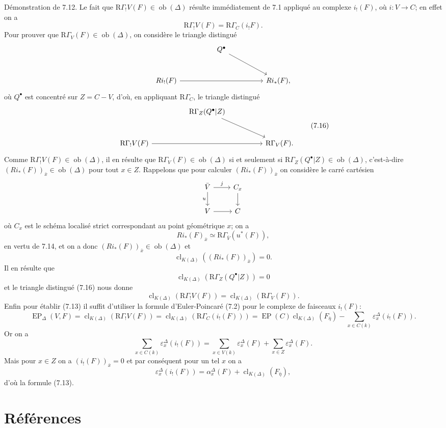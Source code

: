 \documentclass[11pt]{article}
\providecommand{\EP}{\operatorname{EP}}
\providecommand{\Ob}{\operatorname{ob}}
\providecommand{\Ob}{\operatorname{ob}}
\providecommand{\EP}{\operatorname{EP}}
\providecommand{\Ob}{\operatorname{Ob}}
\providecommand{\clK}[1]{\operatorname{cl}_{K(#1)}}
\providecommand{\RG}{\mathrm R\Gamma}
\providecommand{\Ob}{\operatorname{ob}}
\begin{document}
Démonstration de 7.12. Le fait que $\RG_!V(F)\in\Ob(\Delta)$ résulte immédiatement de 7.1 appliqué au complexe $i_!(F)$, où $i:V\to C$; en effet on a
\[
\RG_!V(F)=\RG_C(i_!F).
\]
Pour prouver que $\RG_V(F)\in\Ob(\Delta)$, on considère le triangle distingué
\[
\begin{tikzcd}[column sep=huge,row sep=large]
& Q^\bullet \arrow[dr] &\\
Ri_!(F) \arrow[rr] && Ri_*(F),
\end{tikzcd}
\]
où $Q^\bullet$ est concentré sur $Z=C-V$, d'où, en appliquant $\RG_C$, le triangle distingué
\[
\begin{tikzcd}[column sep=huge,row sep=large]
& \RG_Z(Q^\bullet|Z) \arrow[dr] &\\
\RG_!V(F) \arrow[rr] && \RG_V(F).
\end{tikzcd}
\tag{7.16}
\]
Comme $\RG_!V(F)\in\Ob(\Delta)$, il en résulte que $\RG_V(F)\in\Ob(\Delta)$ si et seulement si $\RG_Z(Q^\bullet|Z)\in\Ob(\Delta)$, c'est-à-dire $(Ri_*(F))_{\bar x}\in\Ob(\Delta)$ pour tout $x\in Z$. Rappelons que pour calculer $(Ri_*(F))_{\bar x}$ on considère le carré cartésien
\[
\begin{tikzcd}
\bar V \arrow[r,"j"] \arrow[d,"u"'] & C_x \arrow[d]\\
V \arrow[r] & C
\end{tikzcd}
\]
où $C_x$ est le schéma localisé strict correspondant au point géométrique $x$; on a
\[
Ri_*(F)_{\bar x}\simeq \RG_{\bar V}(u^*(F)),
\]
en vertu de 7.14, et on a donc $(Ri_*(F))_{\bar x}\in\Ob(\Delta)$ et
\[
\clK{\Delta}((Ri_*(F))_{\bar x})=0.
\]
Il en résulte que
\[
\clK{\Delta}(\RG_Z(Q^\bullet|Z))=0
\]
et le triangle distingué (7.16) nous donne
\[
\clK{\Delta}(\RG_!V(F))=\clK{\Delta}(\RG_V(F)).
\]
Enfin pour établir (7.13) il suffit d'utiliser la formule d'Euler-Poincaré (7.2) pour le complexe de faisceaux $i_!(F)$:
\[
\EP_\Delta(V,F)
=
\clK{\Delta}(\RG_!V(F))
=
\clK{\Delta}(\RG_C(i_!(F)))
=
\EP(C)\clK{\Delta}(F_{\bar\eta})
-\sum_{x\in C(k)}\varepsilon_x^\Delta(i_!(F)).
\]
Or on a
\[
\sum_{x\in C(k)}\varepsilon_x^\Delta(i_!(F))
=
\sum_{x\in V(k)}\varepsilon_x^\Delta(F)
+\sum_{x\in Z}\varepsilon_x^\Delta(F).
\]
Mais pour $x\in Z$ on a $(i_!(F))_{\bar x}=0$ et par conséquent pour un tel $x$ on a
\[
\varepsilon_x^\Delta(i_!(F))
=
\alpha_x^\Delta(F)+\clK{\Delta}(F_{\bar\eta}),
\]
d'où la formule (7.13).

\section*{Références}
\end{document}
